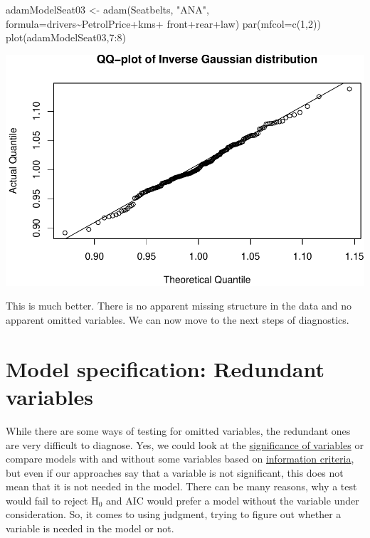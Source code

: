 \documentclass[
]{book}
\newenvironment{Shaded}{\begin{snugshade}}{\end{snugshade}}
\newcommand{\AttributeTok}[1]{\textcolor[rgb]{0.77,0.63,0.00}{#1}}
\newcommand{\DecValTok}[1]{\textcolor[rgb]{0.00,0.00,0.81}{#1}}
\newcommand{\FunctionTok}[1]{\textcolor[rgb]{0.00,0.00,0.00}{#1}}
\newcommand{\NormalTok}[1]{#1}
\newcommand{\OtherTok}[1]{\textcolor[rgb]{0.56,0.35,0.01}{#1}}
\newcommand{\SpecialCharTok}[1]{\textcolor[rgb]{0.00,0.00,0.00}{#1}}
\newcommand{\StringTok}[1]{\textcolor[rgb]{0.31,0.60,0.02}{#1}}
\theoremstyle{definition}
\theoremstyle{definition}
\theoremstyle{definition}
\theoremstyle{definition}
\theoremstyle{remark}
\begin{document}
\begin{Shaded}
\begin{Highlighting}[]
\NormalTok{adamModelSeat03 }\OtherTok{\textless{}{-}} \FunctionTok{adam}\NormalTok{(Seatbelts, }\StringTok{"ANA"}\NormalTok{,}
                        \AttributeTok{formula=}\NormalTok{drivers}\SpecialCharTok{\textasciitilde{}}\NormalTok{PetrolPrice}\SpecialCharTok{+}\NormalTok{kms}\SpecialCharTok{+}
\NormalTok{                          front}\SpecialCharTok{+}\NormalTok{rear}\SpecialCharTok{+}\NormalTok{law)}
\FunctionTok{par}\NormalTok{(}\AttributeTok{mfcol=}\FunctionTok{c}\NormalTok{(}\DecValTok{1}\NormalTok{,}\DecValTok{2}\NormalTok{))}
\FunctionTok{plot}\NormalTok{(adamModelSeat03,}\DecValTok{7}\SpecialCharTok{:}\DecValTok{8}\NormalTok{)}
\end{Highlighting}
\end{Shaded}

\includegraphics{adam_files/figure-latex/unnamed-chunk-133-1.pdf}

This is much better. There is no apparent missing structure in the data and no apparent omitted variables. We can now move to the next steps of diagnostics.

\hypertarget{diagnosticsRedundant}{%
\section{Model specification: Redundant variables}\label{diagnosticsRedundant}}

While there are some ways of testing for omitted variables, the redundant ones are very difficult to diagnose. Yes, we could look at the \protect\hyperlink{hypothesisTesting}{significance of variables} or compare models with and without some variables based on \protect\hyperlink{informationCriteria}{information criteria}, but even if our approaches say that a variable is not significant, this does not mean that it is not needed in the model. There can be many reasons, why a test would fail to reject H\(_0\) and AIC would prefer a model without the variable under consideration. So, it comes to using judgment, trying to figure out whether a variable is needed in the model or not.
\end{document}
